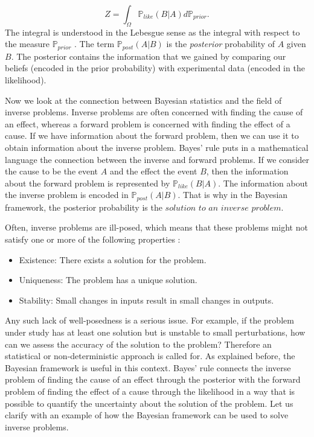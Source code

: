 \documentclass{sfuthesis}
\newcommand{\post}{\mathbb{P}_{post}}
\newcommand{\like}{\mathbb{P}_{like}}
\newcommand{\prior}{\mathbb{P}_{prior}}
\begin{document}
\begin{equation}\label{eqnNormalizationConstant}
Z=\int_{\Omega} \like(B|A)d\prior.
\end{equation}
The integral
is understood in the  Lebesgue sense as the  integral with respect to the measure $\prior$ \cite{lerner2014course}. 
The term $\post(A|B)$ is  the \textit{posterior} probability of $A$ given $B$. The posterior contains  the information 
that we gained by comparing our beliefs (encoded in the prior probability) with experimental data 
(encoded in the likelihood). 
\newline



Now we look at the connection between Bayesian statistics and  the field of inverse problems. 
Inverse problems are  often concerned with finding the cause of an effect, whereas a forward
problem is concerned with finding the effect of a cause. If we have information about the 
forward problem, then we can use it to obtain information about the inverse problem. Bayes' rule
puts in a mathematical language the connection between the inverse and forward problems. 
If we consider the cause to be the
event $A$ and the effect the event $B$, then the information about the forward problem
is represented by $\like(B|A)$. The information about the inverse problem is encoded in 
$\post(A|B)$. That is why in the Bayesian framework, the posterior probability
is the $\textit{solution to an inverse problem}$.

Often, inverse problems
are ill-posed, which means
that these problems might  not satisfy one or more of the following properties \cite{lebedev2012functional}:

\begin{itemize}
\item Existence: There exists a solution for the problem.
\item Uniqueness: The problem has a unique solution.
\item Stability: Small changes in inputs result in small changes in outputs.
\end{itemize}
Any such lack of well-posedness is a serious issue. For example, if the problem under study has at least one solution
but is unstable to small perturbations, how can we assess the accuracy of the solution to 
the problem?
Therefore an statistical or non-deterministic approach is called for. As explained before, the Bayesian framework 
is useful in this context. Bayes' rule connects the inverse problem  of finding the cause
of an effect through the posterior with the forward problem of finding the effect of a cause
through the likelihood in a way that is possible to quantify the uncertainty about the solution
of the problem. Let us  clarify with an example of how the Bayesian framework can be used to solve inverse problems. 
\newline
\end{document}
